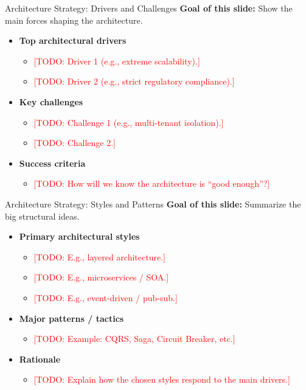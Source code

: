 \documentclass[aspectratio=169]{beamer}
\newcommand{\TODO}[1]{\textcolor{red}{[TODO: #1]}}
\begin{document}
\begin{frame}{Architecture Strategy: Drivers and Challenges}
  \textbf{Goal of this slide:} Show the main forces shaping the architecture.

  \begin{itemize}
    \item \textbf{Top architectural drivers}
      \begin{itemize}
        \item \TODO{Driver 1 (e.g., extreme scalability).}
        \item \TODO{Driver 2 (e.g., strict regulatory compliance).}
      \end{itemize}
    \item \textbf{Key challenges}
      \begin{itemize}
        \item \TODO{Challenge 1 (e.g., multi-tenant isolation).}
        \item \TODO{Challenge 2.}
      \end{itemize}
    \item \textbf{Success criteria}
      \begin{itemize}
        \item \TODO{How will we know the architecture is “good enough”?}
      \end{itemize}
  \end{itemize}
\end{frame}

\begin{frame}{Architecture Strategy: Styles and Patterns}
  \textbf{Goal of this slide:} Summarize the big structural ideas.

  \begin{itemize}
    \item \textbf{Primary architectural styles}
      \begin{itemize}
        \item \TODO{E.g., layered architecture.}
        \item \TODO{E.g., microservices / SOA.}
        \item \TODO{E.g., event-driven / pub-sub.}
      \end{itemize}
    \item \textbf{Major patterns / tactics}
      \begin{itemize}
        \item \TODO{Example: CQRS, Saga, Circuit Breaker, etc.}
      \end{itemize}
    \item \textbf{Rationale}
      \begin{itemize}
        \item \TODO{Explain how the chosen styles respond to the main drivers.}
      \end{itemize}
  \end{itemize}
\end{frame}
\end{document}
